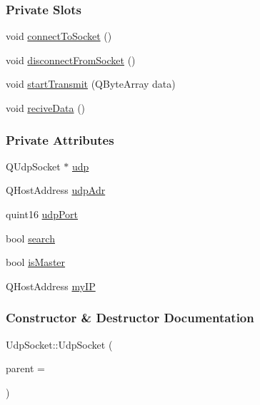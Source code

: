 \subsubsection*{Private Slots}
\begin{DoxyCompactItemize}
\item 
void \mbox{\hyperlink{classUdpSocket_a4c16ef2e336d0504adb9118455fa7154}{connect\+To\+Socket}} ()
\item 
void \mbox{\hyperlink{classUdpSocket_a35cee44b0c57e6e5ec24c692d2ef9fb8}{disconnect\+From\+Socket}} ()
\item 
void \mbox{\hyperlink{classUdpSocket_a5c7396705869aab2fd14770582aff025}{start\+Transmit}} (Q\+Byte\+Array data)
\item 
void \mbox{\hyperlink{classUdpSocket_aa6b5948ab613404d74717eb7d9526dfb}{recive\+Data}} ()
\end{DoxyCompactItemize}
\subsubsection*{Private Attributes}
\begin{DoxyCompactItemize}
\item 
Q\+Udp\+Socket $\ast$ \mbox{\hyperlink{classUdpSocket_ac8d766e026e7685c741f631acc64e906}{udp}}
\item 
Q\+Host\+Address \mbox{\hyperlink{classUdpSocket_abb938c7331685fd351d93be1cb0d8524}{udp\+Adr}}
\item 
quint16 \mbox{\hyperlink{classUdpSocket_a13ad80532191677ae811e88181bed986}{udp\+Port}}
\item 
bool \mbox{\hyperlink{classUdpSocket_aeffff5f69078361d1f7c088827cf651d}{search}}
\item 
bool \mbox{\hyperlink{classUdpSocket_aa5132ded0322787b898fa346a42f7dce}{is\+Master}}
\item 
Q\+Host\+Address \mbox{\hyperlink{classUdpSocket_a784b0938e5af88875f8de414d58e536a}{my\+IP}}
\end{DoxyCompactItemize}


\subsubsection{Constructor \& Destructor Documentation}
\mbox{\label{classUdpSocket_a25a2f670352d9f600143c370beafd8f6}} 
{\footnotesize\ttfamily Udp\+Socket\+::\texorpdfstring{Udp\+Socket}{UdpSocket} (\begin{DoxyParamCaption}\item[{Q\+Widget $\ast$}]{parent = {} }\end{DoxyParamCaption})\hspace{0.3cm}{\ttfamily [explicit]}}



